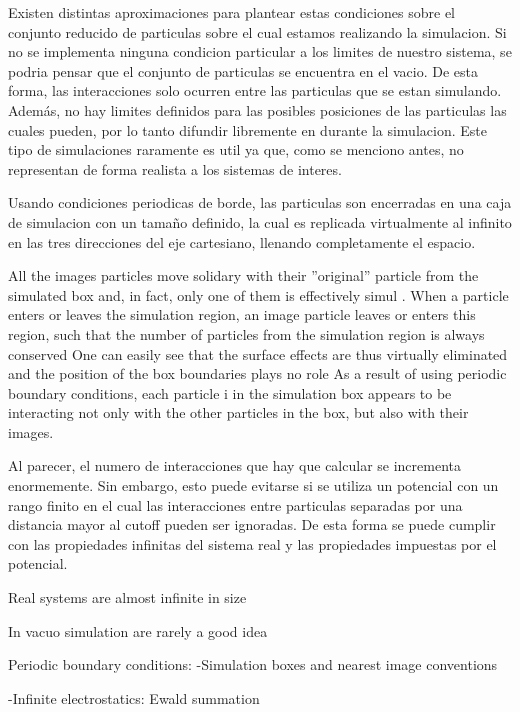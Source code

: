 \documentclass[a4paper,10pt]{report}
\begin{document}
Existen distintas aproximaciones para plantear estas condiciones sobre el conjunto reducido de particulas sobre el cual estamos realizando la simulacion.
Si no se implementa ninguna condicion particular a los limites de nuestro sistema, se podria pensar que el conjunto de particulas se encuentra en el vacio. De esta forma, las interacciones solo ocurren entre las particulas que se estan simulando. 
Además, no hay limites definidos para las posibles posiciones de las particulas las cuales pueden, por lo tanto difundir libremente en durante la simulacion.
Este tipo de simulaciones raramente es util ya que, como se menciono antes, no representan de forma realista a los sistemas de interes.

Usando condiciones periodicas de borde, las particulas son encerradas en una caja de simulacion con un tamaño definido, la cual es replicada virtualmente al infinito en las tres direcciones del eje cartesiano, llenando completamente el espacio.

All the images particles move solidary with their ”original” particle from the simulated box and, in fact, only one of them is effectively simul
. When a particle enters or leaves the simulation region, an image particle leaves or enters this region, such that the number of particles from the simulation region is always conserved
One can easily see that the surface effects are thus virtually eliminated and the position of the box boundaries plays no role
As a result of using periodic boundary
conditions, each particle i in the simulation box appears to be interacting
not only with the other particles in the box, but also with their images. 

Al parecer, el numero de interacciones que hay que calcular se incrementa enormemente. Sin embargo, esto puede evitarse si se utiliza un potencial con un rango finito en el cual las interacciones entre particulas separadas por una distancia mayor al cutoff pueden ser ignoradas.
De esta forma se puede cumplir con las propiedades infinitas del sistema real y las propiedades impuestas por el potencial.






Real systems are almost infinite in size

In vacuo simulation are rarely a good idea

Periodic boundary conditions: 
-Simulation boxes and nearest image conventions

-Infinite electrostatics: Ewald summation
\end{document}
